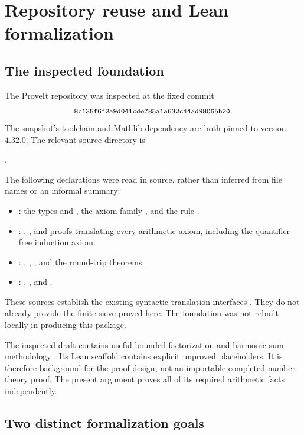 \section{Repository reuse and Lean formalization}
\label{sec:lean}

\subsection{The inspected foundation}

The ProveIt repository was inspected at the fixed commit
\[
 \texttt{\small 8c135f6f2a9d041cde785a1a632c44ad98065b20}.
\]
The snapshot's toolchain and Mathlib dependency are both pinned to
version \(4.32.0\). The relevant source directory is
\begin{center}
.
\end{center}
The following declarations were read in source, rather than inferred
from file names or an informal summary:
\begin{itemize}
\item {}: the types  and , the axiom
family , and the rule .
\item {}: ,
, and proofs translating every arithmetic axiom,
including the quantifier-free induction axiom.
\item {}: ,
, , and the round-trip theorems.
\item {}: ,
, and .
\end{itemize}
These sources establish the existing syntactic translation interfaces
\cite{proveit}. They do not already provide the finite sieve proved here.
The foundation was not rebuilt locally in producing this package.

The inspected draft
contains useful bounded-factorization and harmonic-sum methodology
\cite{prime-draft}. Its Lean scaffold contains explicit unproved
placeholders. It is therefore background for the proof design, not an
importable completed number-theory proof. The present argument proves
all of its required arithmetic facts independently.

\subsection{Two distinct formalization goals}

